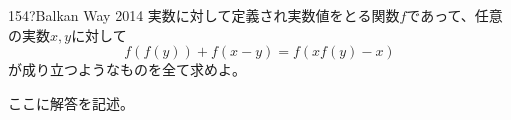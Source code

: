 \begin{prob}{154}{\hosi ?}{Balkan Way 2014}
 実数に対して定義され実数値をとる関数$f$であって、任意の実数$x, y$に対して
 \[ f\left(f(y)\right)+f(x-y)=f\left(xf(y)-x\right) \]
 が成り立つようなものを全て求めよ。
\end{prob}
ここに解答を記述。